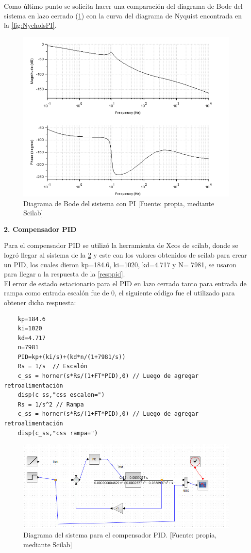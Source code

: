 \documentclass[12pt,letterpaper]{article}
\begin{document}
Como último punto se solicita hacer una comparación del diagrama de Bode del sistema en lazo cerrado (\ref{fig:bodePI}) con la curva del diagrama de Nyquist encontrada en la \ref{fig:NycholsPI}.

\begin{figure}[hbtp]
	\centering
	\includegraphics[width = 0.7 \columnwidth]{BodePI.png} 
	\caption[Figura7]{Diagrama de Bode del sistema con PI [Fuente: propia, mediante Scilab]} 
	\label{fig:bodePI} 
\end{figure}


\bigskip

\textbf{2. Compensador PID}

\bigskip

Para el compensador PID se utilizó la herramienta de Xcos de scilab, donde se logró llegar al sistema de la \ref{pidb} y este con los valores obtenidos de scilab para crear un PID, los cuales dieron kp=184.6, ki=1020, kd=4.717 y N= 7981, se usaron para llegar a la respuesta de la \ref{resppid}. \\

El error de estado estacionario para el PID en lazo cerrado tanto para entrada de rampa como entrada escalón fue de 0, el siguiente código fue el utilizado para obtener dicha respuesta:

\begin{verbatim}
    kp=184.6
    ki=1020
    kd=4.717
    n=7981
    PID=kp+(ki/s)+(kd*n/(1+7981/s))
    Rs = 1/s  // Escalón
    c_ss = horner(s*Rs/(1+FT*PID),0) // Luego de agregar retroalimentación
    disp(c_ss,"css escalon=")
    Rs = 1/s^2 // Rampa
    c_ss = horner(s*Rs/(1+FT*PID),0) // Luego de agregar retroalimentación
    disp(c_ss,"css rampa=")
\end{verbatim}

\begin{figure}[hbtp]
	\centering
	\includegraphics[width = .9 \columnwidth]{pidb.jpeg} 
	\caption[Figura7]{Diagrama del sistema para el compensador PID. [Fuente: propia, mediante Scilab]} 
	\label{pidb} 
\end{figure}
\end{document}
